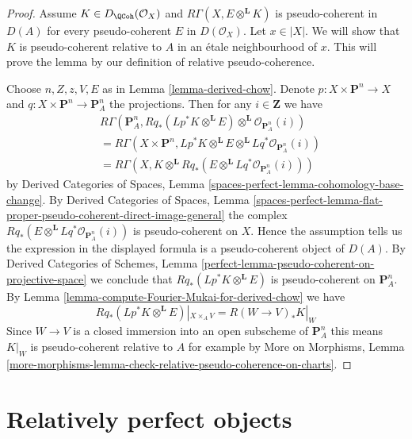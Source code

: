 \begin{proof}
Assume $K \in D_\QCoh(\mathcal{O}_X)$ and
$R\Gamma(X, E \otimes^\mathbf{L} K)$ is pseudo-coherent
in $D(A)$ for every pseudo-coherent $E$ in $D(\mathcal{O}_X)$.
Let $x \in |X|$. We will show that $K$ is pseudo-coherent relative to $A$
in an \'etale neighbourhood of $x$. This will prove the lemma
by our definition of relative pseudo-coherence.

\medskip\noindent
Choose $n, Z, z, V, E$ as in Lemma \ref{lemma-derived-chow}.
Denote $p : X \times \mathbf{P}^n \to X$ and
$q : X \times \mathbf{P}^n \to \mathbf{P}^n_A$
the projections.
Then for any $i \in \mathbf{Z}$ we have
\begin{align*}
& R\Gamma(\mathbf{P}^n_A,
Rq_*(Lp^*K \otimes^\mathbf{L} E)
\otimes^\mathbf{L}
\mathcal{O}_{\mathbf{P}^n_A}(i)) \\
& =
R\Gamma(X \times \mathbf{P}^n,
Lp^*K \otimes^\mathbf{L} E \otimes^\mathbf{L}
Lq^*\mathcal{O}_{\mathbf{P}^n_A}(i)) \\
& =
R\Gamma(X,
K \otimes^\mathbf{L} Rq_*(E \otimes^\mathbf{L}
Lq^*\mathcal{O}_{\mathbf{P}^n_A}(i)))
\end{align*}
by
Derived Categories of Spaces,
Lemma \ref{spaces-perfect-lemma-cohomology-base-change}.
By
Derived Categories of Spaces, Lemma
\ref{spaces-perfect-lemma-flat-proper-pseudo-coherent-direct-image-general}
the complex $Rq_*(E \otimes^\mathbf{L} Lq^*\mathcal{O}_{\mathbf{P}^n_A}(i))$
is pseudo-coherent on $X$. Hence the assumption tells us the expression
in the displayed formula is a pseudo-coherent object of $D(A)$.
By
Derived Categories of Schemes,
Lemma \ref{perfect-lemma-pseudo-coherent-on-projective-space}
we conclude that $Rq_*(Lp^*K \otimes^\mathbf{L} E)$ is
pseudo-coherent on $\mathbf{P}^n_A$.
By Lemma \ref{lemma-compute-Fourier-Mukai-for-derived-chow}
we have
$$
Rq_*(Lp^*K \otimes^\mathbf{L} E)|_{X \times_A V} =
R(W \to V)_*K|_W
$$
Since $W \to V$ is a closed immersion into an open subscheme of
$\mathbf{P}^n_A$ this means $K|_W$ is pseudo-coherent relative to $A$
for example by
More on Morphisms,
Lemma \ref{more-morphisms-lemma-check-relative-pseudo-coherence-on-charts}.
\end{proof}










\section{Relatively perfect objects}
\label{section-relatively-perfect}

